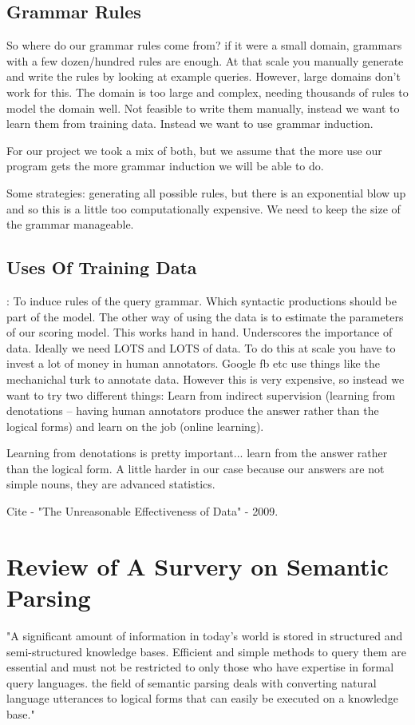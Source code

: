 \documentclass[pageno]{jpaper}
\begin{document}
\subsection{Grammar Rules}
So where do our grammar rules come from? if it were a small domain, grammars with a few dozen/hundred rules are enough. At that scale you manually generate and write the rules by looking at example queries. However, large domains don't work for this. The domain is too large and complex, needing thousands of rules to model the domain well. Not feasible to write them manually, instead we want to learn them from training data. Instead we want to use grammar induction. 

For our project we took a mix of both, but we assume that the more use our program gets the more grammar induction we will be able to do.

Some strategies: generating all possible rules, but there is an exponential blow up and so this is a little too computationally expensive. We need to keep the size of the grammar manageable. 




\subsection{Uses Of Training Data}:
To induce rules of the query grammar. Which syntactic productions should be part of the model. The other way of using the data is to estimate the parameters of our scoring model. This works hand in hand. Underscores the importance of data. Ideally we need LOTS and LOTS of data. To do this at scale you have to invest a lot of money in human annotators. Google fb etc use things like the mechanichal turk to annotate data. However this is very expensive, so instead we want to try two different things:
Learn from indirect supervision (learning from denotations -- having human annotators produce the answer rather than the logical forms) and learn on the job (online learning).

Learning from denotations is pretty important... learn from the answer rather than the logical form. A little harder in our case because our answers are not simple nouns, they are advanced statistics.

Cite - "The Unreasonable Effectiveness of Data" - 2009. 


\section{Review of A Survery on Semantic Parsing}
"A significant amount of information in today's world is stored in structured and semi-structured knowledge bases. Efficient and simple methods to query them are essential and must not be restricted to only those who have expertise in formal query languages. the field of semantic parsing deals with converting natural language utterances to logical forms that can easily be executed on a knowledge base."
\end{document}
